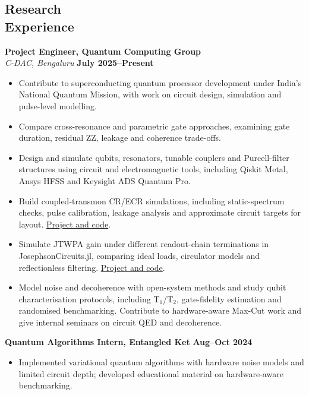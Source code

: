 \documentclass[margin,line]{resume}
\newcommand{\projectlink}[2]{\href{https://mukul-quantum-researcher.github.io/projects/#1/}{#2}}
\newcommand{\cvheading}[1]{\section{\mysidestyle #1}}
\begin{document}
\begin{resume}
\cvheading{Research\\Experience}
\textbf{Project Engineer, Quantum Computing Group}\\
\textsl{C-DAC, Bengaluru} \hfill \textbf{July 2025--Present}
\begin{itemize}
\item Contribute to superconducting quantum processor development under India's National Quantum Mission, with work on circuit design, simulation and pulse-level modelling.
\item Compare cross-resonance and parametric gate approaches, examining gate duration, residual ZZ, leakage and coherence trade-offs.
\item Design and simulate qubits, resonators, tunable couplers and Purcell-filter structures using circuit and electromagnetic tools, including Qiskit Metal, Ansys HFSS and Keysight ADS Quantum Pro.
\item Build coupled-transmon CR/ECR simulations, including static-spectrum checks, pulse calibration, leakage analysis and approximate circuit targets for layout. \projectlink{cr-ecr}{Project and code}.
\item Simulate JTWPA gain under different readout-chain terminations in JosephsonCircuits.jl, comparing ideal loads, circulator models and reflectionless filtering. \projectlink{reflectionless-filter}{Project and code}.
\item Model noise and decoherence with open-system methods and study qubit characterisation protocols, including T$_1$/T$_2$, gate-fidelity estimation and randomised benchmarking. Contribute to hardware-aware Max-Cut work and give internal seminars on circuit QED and decoherence.
\end{itemize}

\textbf{Quantum Algorithms Intern, Entangled Ket} \hfill \textbf{Aug--Oct 2024}
\begin{itemize}
\item Implemented variational quantum algorithms with hardware noise models and limited circuit depth; developed educational material on hardware-aware benchmarking.
\end{itemize}


\end{resume}
\end{document}
